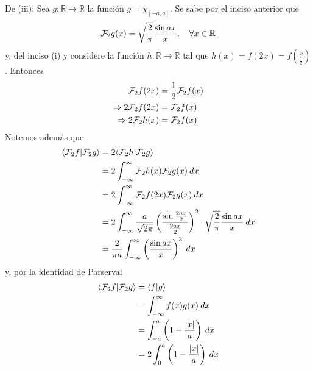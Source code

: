 \documentclass[12pt]{report}
\theoremstyle{largebreak}
\newcommand\abs[1]{\ensuremath{\left|#1\right|}}
\newcommand\cf[3]{\ensuremath{#1:#2\rightarrow#3}}
\newcommand\pint[2]{\ensuremath{\langle#1| #2\rangle}}
\newcommand{\fou}[1]{\ensuremath{\mathcal{F}#1}}
\begin{document}
\begin{sol}
        De (iii): Sea $\cf{g}{\mathbb{R}}{\mathbb{R}}$ la función $g=\chi_{[-a,a]}$. Se sabe por el inciso anterior que
        \begin{equation*}
            \fou_2{g}(x)=\sqrt{\frac{2}{\pi}}\frac{\sin ax}{x},\quad\forall x\in\mathbb{R}
        \end{equation*}
        y, del inciso (i) y considere la función $\cf{h}{\mathbb{R}}{\mathbb{R}}$ tal que $h(x)=f(2x)=f\left(\frac{x}{\frac{1}{2}}\right)$. Entonces
        \begin{equation*}
            \begin{split}
                \fou_2{f}(2x)&=\frac{1}{2}\fou_2{f}(x)\\
                \Rightarrow 2\fou_2{f}(2x)&=\fou_2{f}(x)\\
                \Rightarrow 2\fou_2{h}(x)&=\fou_2{f}(x)\\
            \end{split}
        \end{equation*}
        Notemos además que
        \begin{equation*}
            \begin{split}
                \pint{\fou_2{f}}{\fou_2{g}}&=2\pint{\fou_2{h}}{\fou_2{g}}\\
                &=2\int_{-\infty}^\infty \fou_2{h}(x)\fou_2{g}(x)\:dx\\
                &=2\int_{ -\infty}^{\infty}\fou_2{f}(2x)\fou_2{g}(x)\:dx\\
                &=2\int_{-\infty}^{\infty}\frac{a}{\sqrt{2\pi}}\left(\frac{\sin\frac{2ax}{2}}{\frac{2ax}{2}} \right)^2\cdot\sqrt{\frac{2}{\pi}}\frac{\sin ax}{x}\:dx\\
                &=\frac{2}{\pi a}\int_{-\infty}^{\infty}\left(\frac{\sin ax}{x}\right)^3\:dx\\
            \end{split}
        \end{equation*}
        y, por la identidad de Parserval
        \begin{equation*}
            \begin{split}
                \pint{\fou_2{f}}{\fou_2{g}}&=\pint{f}{g}\\
                &=\int_{-\infty}^\infty f(x)g(x)\:dx\\
                &=\int_{-a}^a \left(1-\frac{\abs{x}}{a}\right)\:dx\\
                &=2\int_{0}^a \left(1-\frac{\abs{x}}{a}\right)\:dx\\

\end{split}
\end{equation*}
\end{sol}
\end{document}
